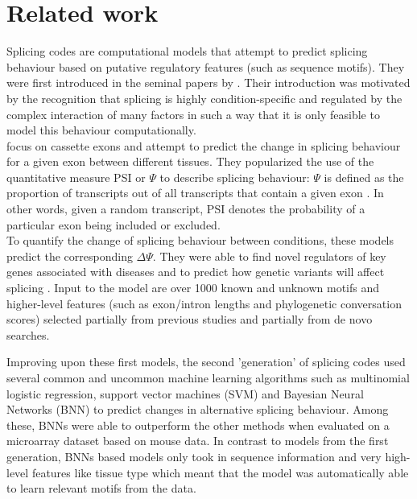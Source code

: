 \chapter{\label{ch:3-relatedwork}Related work}

Splicing codes are computational models that attempt to predict splicing behaviour based on putative regulatory features (such as sequence motifs).
They were first introduced in the seminal papers by \cite{barash2010a}\cite{barash2010b}. Their introduction was motivated by the recognition that splicing is highly condition-specific and regulated by the complex interaction of many factors in such a way that it is only feasible to model this behaviour computationally.\\
\cite{barash2010a} focus on cassette exons and attempt to predict the change in splicing behaviour for a given exon between different tissues. They popularized the use of the quantitative measure PSI or $\Psi$ to describe splicing behaviour:
$\Psi$ is defined as the proportion of transcripts out of all transcripts that contain a given exon \cite{psi}. In other words, given a random transcript, PSI denotes the probability of a particular exon being included or excluded.\\
To quantify the change of splicing behaviour between conditions, these models predict the corresponding $\Delta \Psi$. They were able to find novel regulators of key genes associated with diseases and to predict how genetic variants will affect splicing \cite{splicingcodegood1} \cite{splicingcodegood2}. Input to the model are over 1000 known and unknown motifs and higher-level features (such as exon/intron lengths and phylogenetic conversation scores) selected partially from previous studies and partially from de novo searches.


Improving upon these first models, the second 'generation' of splicing codes used several common and uncommon machine learning algorithms such as multinomial logistic regression, support vector machines (SVM) and Bayesian Neural Networks (BNN) to predict changes in alternative splicing behaviour. \cite{bnnsplicing} Among these, BNNs were able to outperform the other methods when evaluated on a microarray dataset based on mouse data. In contrast to models from the first generation, BNNs based models only took in sequence information and very high-level features like tissue type which meant that the model was automatically able to learn relevant motifs from the data.


